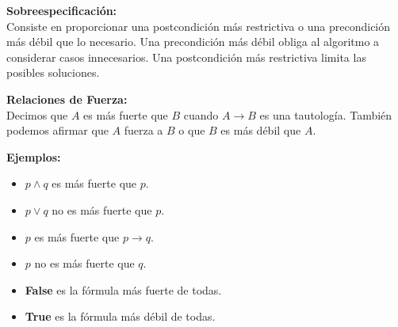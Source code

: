 \documentclass[9pt]{extarticle}  %
\begin{document}
\noindent\textbf{Sobreespecificación:} \\
Consiste en proporcionar una postcondición más restrictiva o una precondición más débil que lo necesario. Una precondición más débil obliga al algoritmo a considerar casos innecesarios. Una postcondición más restrictiva limita las posibles soluciones.

\noindent\textbf{Relaciones de Fuerza:} \\
Decimos que \(A\) es más fuerte que \(B\) cuando \(A \rightarrow B\) es una tautología. También podemos afirmar que \(A\) fuerza a \(B\) o que \(B\) es más débil que \(A\).

\noindent\textbf{Ejemplos:}
\begin{itemize}
    \item \(p \land q\) es más fuerte que \(p\).
    \item \(p \lor q\) no es más fuerte que \(p\).
    \item \(p\) es más fuerte que \(p \rightarrow q\).
    \item \(p\) no es más fuerte que \(q\).
    \item \textbf{False} es la fórmula más fuerte de todas.
    \item \textbf{True} es la fórmula más débil de todas.
\end{itemize}
\end{document}
